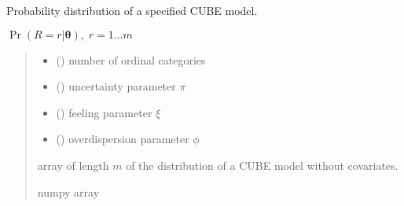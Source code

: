 \documentclass[letterpaper,10pt,english]{sphinxmanual}
\begin{document}

\begin{fulllineitems}
\label{\detokenize{cubmods:cubmods.cube.pmf}}
\pysigstartsignatures
{}
\pysigstopsignatures
\sphinxAtStartPar
Probability distribution of a specified CUBE model.

\sphinxAtStartPar
\(\Pr(R = r | \pmb\theta),\; r=1 \ldots m\)
\begin{quote}\begin{description}
\begin{itemize}
\item {} 
\sphinxAtStartPar
{} () \textendash{} number of ordinal categories

\item {} 
\sphinxAtStartPar
{} () \textendash{} uncertainty parameter \(\pi\)

\item {} 
\sphinxAtStartPar
{} () \textendash{} feeling parameter \(\xi\)

\item {} 
\sphinxAtStartPar
{} () \textendash{} overdispersion parameter \(\phi\)

\end{itemize}

\sphinxAtStartPar
array of length \(m\) of the distribution of a CUBE model without covariates.

\sphinxAtStartPar
numpy array

\end{description}\end{quote}

\end{fulllineitems}

\end{document}
